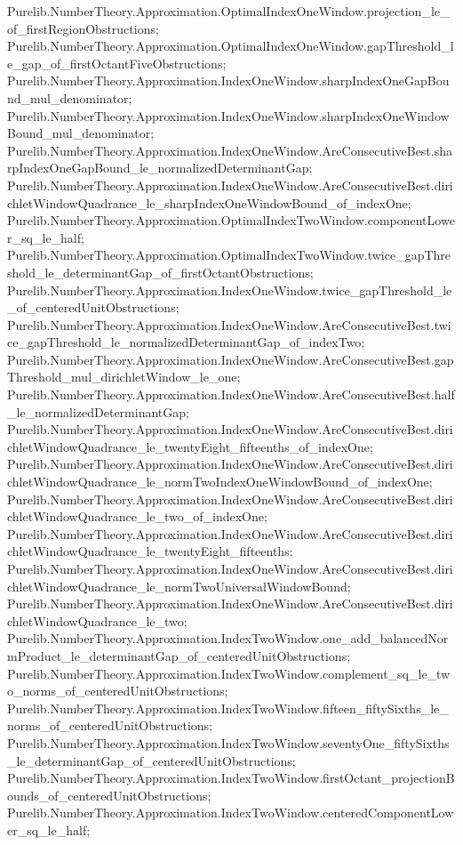 \documentclass[11pt]{article}
\begin{document}
{Purelib.NumberTheory.Approximation.OptimalIndexOneWindow.projection_le_of_firstRegionObstructions;
Purelib.NumberTheory.Approximation.OptimalIndexOneWindow.gapThreshold_le_gap_of_firstOctantFiveObstructions;
Purelib.NumberTheory.Approximation.IndexOneWindow.sharpIndexOneGapBound_mul_denominator;
Purelib.NumberTheory.Approximation.IndexOneWindow.sharpIndexOneWindowBound_mul_denominator;
Purelib.NumberTheory.Approximation.IndexOneWindow.AreConsecutiveBest.sharpIndexOneGapBound_le_normalizedDeterminantGap;
Purelib.NumberTheory.Approximation.IndexOneWindow.AreConsecutiveBest.dirichletWindowQuadrance_le_sharpIndexOneWindowBound_of_indexOne;
Purelib.NumberTheory.Approximation.OptimalIndexTwoWindow.componentLower_sq_le_half;
Purelib.NumberTheory.Approximation.OptimalIndexTwoWindow.twice_gapThreshold_le_determinantGap_of_firstOctantObstructions;
Purelib.NumberTheory.Approximation.IndexOneWindow.twice_gapThreshold_le_of_centeredUnitObstructions;
Purelib.NumberTheory.Approximation.IndexOneWindow.AreConsecutiveBest.twice_gapThreshold_le_normalizedDeterminantGap_of_indexTwo;
Purelib.NumberTheory.Approximation.IndexOneWindow.AreConsecutiveBest.gapThreshold_mul_dirichletWindow_le_one;
Purelib.NumberTheory.Approximation.IndexOneWindow.AreConsecutiveBest.half_le_normalizedDeterminantGap;
Purelib.NumberTheory.Approximation.IndexOneWindow.AreConsecutiveBest.dirichletWindowQuadrance_le_twentyEight_fifteenths_of_indexOne;
Purelib.NumberTheory.Approximation.IndexOneWindow.AreConsecutiveBest.dirichletWindowQuadrance_le_normTwoIndexOneWindowBound_of_indexOne;
Purelib.NumberTheory.Approximation.IndexOneWindow.AreConsecutiveBest.dirichletWindowQuadrance_le_two_of_indexOne;
Purelib.NumberTheory.Approximation.IndexOneWindow.AreConsecutiveBest.dirichletWindowQuadrance_le_twentyEight_fifteenths;
Purelib.NumberTheory.Approximation.IndexOneWindow.AreConsecutiveBest.dirichletWindowQuadrance_le_normTwoUniversalWindowBound;
Purelib.NumberTheory.Approximation.IndexOneWindow.AreConsecutiveBest.dirichletWindowQuadrance_le_two;
Purelib.NumberTheory.Approximation.IndexTwoWindow.one_add_balancedNormProduct_le_determinantGap_of_centeredUnitObstructions;
Purelib.NumberTheory.Approximation.IndexTwoWindow.complement_sq_le_two_norms_of_centeredUnitObstructions;
Purelib.NumberTheory.Approximation.IndexTwoWindow.fifteen_fiftySixths_le_norms_of_centeredUnitObstructions;
Purelib.NumberTheory.Approximation.IndexTwoWindow.seventyOne_fiftySixths_le_determinantGap_of_centeredUnitObstructions;
Purelib.NumberTheory.Approximation.IndexTwoWindow.firstOctant_projectionBounds_of_centeredUnitObstructions;
Purelib.NumberTheory.Approximation.IndexTwoWindow.centeredComponentLower_sq_le_half;
}
\end{document}
